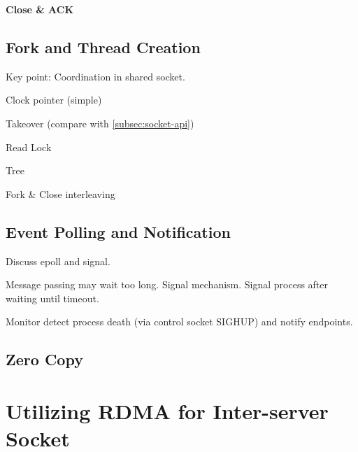     \textbf{Close \& ACK}


\subsection{Fork and Thread Creation}
\label{subsec:fork}

Key point: Coordination in shared socket.

Clock pointer (simple)

Takeover (compare with \ref{subsec:socket-api})

Read Lock

Tree

Fork \& Close interleaving





\subsection{Event Polling and Notification}
\label{subsec:epoll}

Discuss epoll and signal.

Message passing may wait too long.
Signal mechanism. Signal process after waiting until timeout.

Monitor detect process death (via control socket SIGHUP) and notify endpoints.


\subsection{Zero Copy}
\label{subsec:zerocopy}



\section{Utilizing RDMA for Inter-server Socket}
\label{sec:rdma}

